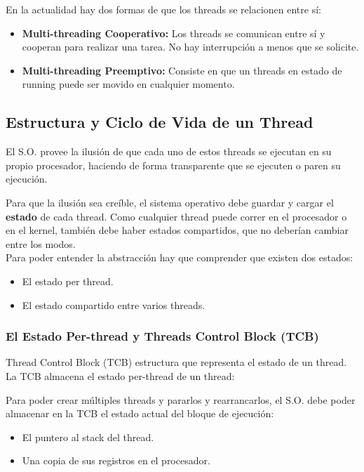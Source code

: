 \documentclass[../main.tex]{subfiles}
\begin{document}
            En la actualidad hay dos formas de que los threads se relacionen entre sí:
            \begin{itemize}
                \item \textbf{Multi-threading Cooperativo:} Los threads se comunican entre sí y cooperan para realizar una tarea. No hay interrupción a menos que se solicite.
                \item \textbf{Multi-threading Preemptivo:} Consiste en que un threads en estado de running puede ser movido en cualquier momento.
            \end{itemize}



    \subsection{Estructura y Ciclo de Vida de un Thread}
        El S.O. provee la ilusión de que cada uno de estos threads se ejecutan en su propio procesador, haciendo de forma transparente que se ejecuten o paren su ejecución.

        Para que la ilusión sea creíble, el sistema operativo debe guardar y cargar el \textbf{estado} de cada thread. Como cualquier thread puede correr en el procesador o en el kernel, también debe haber estados compartidos, que no deberían cambiar entre los modos.\\
        
        Para poder entender la abstracción hay que comprender que existen dos estados:
        \begin{itemize}
            \item El estado per thread.
            \item El estado compartido entre varios threads.
        \end{itemize}

        \subsubsection{El Estado Per-thread y Threads Control Block (TCB)}
            Thread Control Block (TCB) estructura que representa el estado de un thread. La TCB almacena el estado per-thread de un thread:
        
            Para poder crear múltiples threads y pararlos y rearrancarlos, el S.O. debe poder almacenar en la TCB el estado actual del bloque de ejecución:

            \begin{itemize}
                \item El puntero al stack del thread.
                \item Una copia de sus registros en el procesador.
            \end{itemize}
\end{document}
